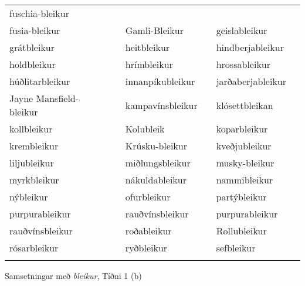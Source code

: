 \documentclass[../samsetningasafn.tex]{subfiles}
\begin{document}
\begin{wordlist}[H]
\begin{tcolorbox}
\begin{tabular}{BlBlBl}
		fuschia-bleikur	&		\\  %
		fusia-bleikur		&		& 
		Gamli-Bleikur		&		& 
		geislableikur		&		\\  %
		grátbleikur		&		& 
		heitbleikur		&		& 
		hindberjableikur	&		\\  %
		holdbleikur		&		& 
		hrímbleikur		&		& 
		hrossableikur		&		\\  %
		húðlitarbleikur	&		& 
		innanpíkubleikur	&		& 
		jarðaberjableikur	&		\\  %
		Jayne Mansfield-bleikur &	& 
		kampavínsbleikur	&		& 
		klósettbleikan	&		\\  %
		kollbleikur		&		& 
		Kolubleik		&		& 
		koparbleikur		&		\\  %
		krembleikur		&		& 
		Krúsku-bleikur	&		& 
		kveðjubleikur		&		\\  %
		liljubleikur		&		& 
		miðlungsbleikur	&		& 
		musky-bleikur	&		\\  %
		myrkbleikur		&		& 
		nákuldableikur	&		& 
		nammibleikur	&		\\  %
		nýbleikur		&		& 
		ofurbleikur		&		& 
		partýbleikur		&		\\  %
		purpurableikur	&		& 
		rauðvínsbleikur	&		& 
		purpurableikur	&		\\  %
		rauðvínsbleikur	&		& 
		roðableikur		&		& 
		Rollubleikur		&		\\  %
		rósarbleikur		&		& 
		ryðbleikur		&		& 
		sefbleikur		&		\\  %
	\end{tabular}
		
\end{tcolorbox}
	\caption{Samsetningar með \textit{bleikur}, Tíðni 1 (b)}
	\label{listi:bleikt.1b}
\end{wordlist}			
\end{document}
